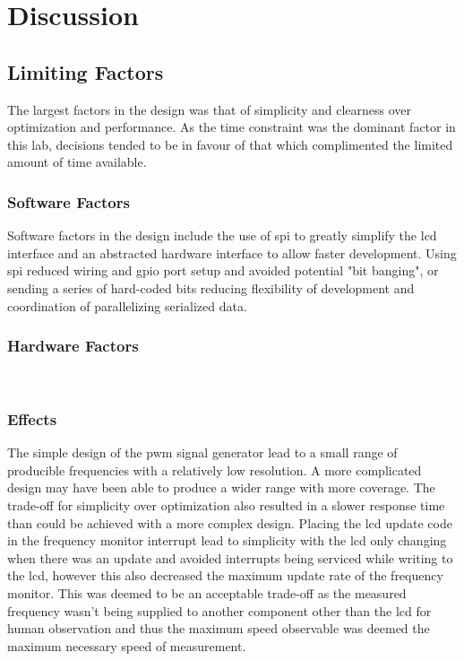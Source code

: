 
\section{Discussion}
\subsection{Limiting Factors}
The largest factors in the design was that of simplicity and clearness
over optimization and performance. As the time constraint was the
dominant factor in this lab, decisions tended to be in favour of that
which complimented the limited amount of time available.

\subsubsection{Software Factors}
Software factors in the design include the use of \gls{spi} to greatly
simplify the \gls{lcd} interface and an abstracted hardware interface to
allow faster development. Using \gls{spi} reduced wiring and \gls{gpio}
port setup and avoided potential "bit banging", or sending a series of
hard-coded bits reducing flexibility of development and coordination of
parallelizing serialized data. \\

\subsubsection{Hardware Factors}
 \\

\subsubsection{Effects}
The simple design of the \gls{pwm} signal generator lead to a small
range of producible frequencies with a relatively low resolution. A more
complicated design may have been able to produce a wider range with more
coverage. The trade-off for simplicity over optimization also resulted
in a slower response time than could be achieved with a more complex
design. Placing the \gls{lcd} update code in the frequency monitor
interrupt lead to simplicity with the \gls{lcd} only changing when there
was an update and avoided interrupts being serviced while writing to the
\gls{lcd}, however this also decreased the maximum update rate of the
frequency monitor. This was deemed to be an acceptable trade-off as the
measured frequency wasn't being supplied to another component other than
the \gls{lcd} for human observation and thus the maximum speed
observable was deemed the maximum necessary speed of measurement.
